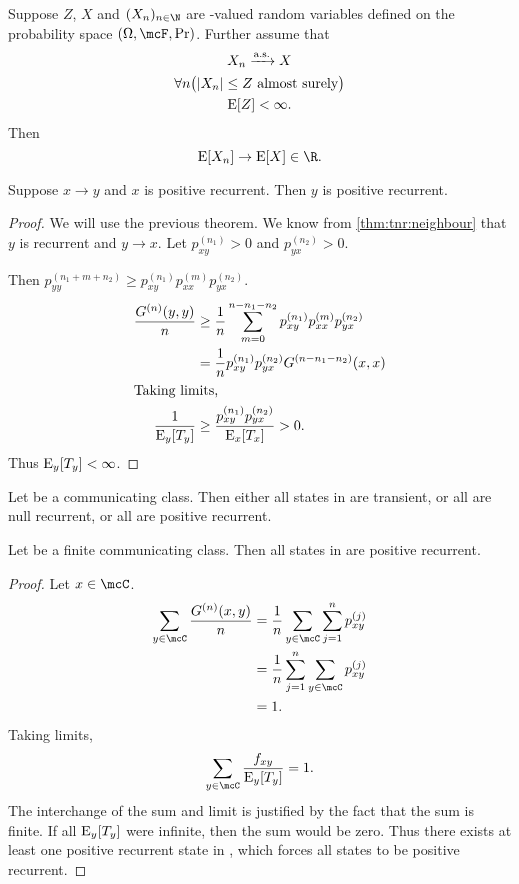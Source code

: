 \begin{fact*} \label{thm:dct}
    Suppose $Z$, $X$ and $(X_n)_{n \in \N}$ are \R-valued random variables
    defined on the probability space $(\Omega, \mcF, \Pr)$.
    Further assume that \begin{gather*}
        X_n \xrightarrow{\text{a.s.}} X \\
        \forall n \big(\abs{X_n} \le Z \text{ almost surely}\big) \\
        \operatorname{\mathrm{E}}[Z] < \infty.
    \end{gather*}
    Then \[
        \E[X_n] \to \E[X] \in \R.
    \]
\end{fact*}

\begin{theorem*}
    Suppose $x \to y$ and $x$ is positive recurrent.
    Then $y$ is positive recurrent.
\end{theorem*}
\begin{proof}
    We will use the previous theorem.
    We know from \cref{thm:tnr:neighbour} that $y$ is recurrent and
    $y \to x$.
    Let $p_{xy}^{(n_1)} > 0$ and $p_{yx}^{(n_2)} > 0$.

    Then $p_{yy}^{(n_1 + m + n_2)} \ge p_{xy}^{(n_1)} p_{xx}^{(m)} p_{yx}^{(n_2)}$.
    \begin{align*}
        \frac{G^{(n)}(y, y)}{n} &\ge \frac1n \sum_{m=0}^{n-n_1-n_2} p_{xy}^{(n_1)} p_{xx}^{(m)} p_{yx}^{(n_2)} \\
        &= \frac1n p_{xy}^{(n_1)} p_{yx}^{(n_2)} G^{(n-n_1-n_2)}(x, x) \\
        \intertext{Taking limits,}
        \frac1{\operatorname{\mathrm{E}}_y[T_y]} &\ge \frac{p_{xy}^{(n_1)} p_{yx}^{(n_2)}}{\operatorname{\mathrm{E}}_x[T_x]} > 0.
    \end{align*}
    Thus $\operatorname{\mathrm{E}}_y[T_y] < \infty$.
\end{proof}

\begin{corollary}
    Let \mcC{} be a communicating class.
    Then either all states in \mcC{} are transient,
    or all are null recurrent,
    or all are positive recurrent.
\end{corollary}

\begin{theorem*}
    Let \mcC{} be a finite communicating class.
    Then all states in \mcC{} are positive recurrent.
\end{theorem*}
\begin{proof}
    Let $x \in \mcC$.
    \begin{align*}
        \sum_{y \in \mcC} \frac{G^{(n)}(x, y)}{n}
            &= \frac1n \sum_{y \in \mcC} \sum_{j=1}^{n} p_{xy}^{(j)} \\
            &= \frac1n \sum_{j=1}^{n} \sum_{y \in \mcC} p_{xy}^{(j)} \\
            &= 1.
    \end{align*}
    Taking limits, \[
        \sum_{y \in \mcC} \frac{f_{xy}}{\E_y[T_y]} = 1.
    \] The interchange of the sum and limit is justified by the fact that
    the sum is finite.
    If all $\operatorname{\mathrm{E}}_y[T_y]$ were infinite, then the sum would be zero.
    Thus there exists at least one positive recurrent state in \mcC,
    which forces all states to be positive recurrent.
\end{proof}

